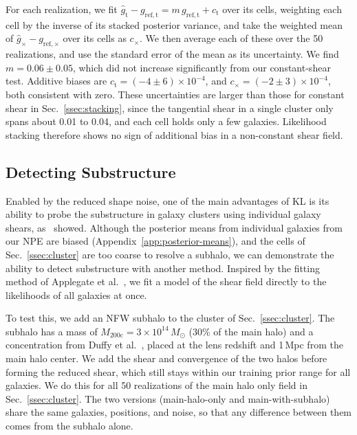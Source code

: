 For each realization, we fit $\hat{g}_\mathrm{t} - g_{\mathrm{ref,t}} = m\, g_{\mathrm{ref,t}} + c_\mathrm{t}$ over its cells, weighting each cell by the inverse of its stacked posterior variance, and take the weighted mean of $\hat{g}_\times - g_{\mathrm{ref},\times}$ over its cells as $c_\times$. We then average each of these over the 50 realizations, and use the standard error of the mean as its uncertainty. We find $m = 0.06 \pm 0.05$, which did not increase significantly from our constant-shear test. Additive biases are $c_\mathrm{t} = (-4 \pm 6) \times 10^{-4}$, and $c_\times = (-2 \pm 3) \times 10^{-4}$, both consistent with zero. These uncertainties are larger than those for constant shear in Sec.~\ref{ssec:stacking}, since the tangential shear in a single cluster only spans about 0.01 to 0.04, and each cell holds only a few galaxies.  Likelihood stacking therefore shows no sign of additional bias in a non-constant shear field. 

\subsection{Detecting Substructure}
\label{ssec:substructure}

Enabled by the reduced shape noise, one of the main advantages of KL is its ability to probe the substructure in galaxy clusters using individual galaxy shears, as~\citep{KLCluster} showed. Although the posterior means from individual galaxies from our NPE are biased (Appendix~\ref{app:posterior-means}), and the cells of Sec.~\ref{ssec:cluster} are too coarse to resolve a subhalo, we can demonstrate the ability to detect substructure with another method. Inspired by the fitting method of Applegate et al.~\citep{WtG3}, we fit a model of the shear field directly to the likelihoods of all galaxies at once.

To test this, we add an NFW subhalo to the cluster of Sec.~\ref{ssec:cluster}. The subhalo has a mass of $M_\mathrm{200c} = 3\times10^{14}\,M_\odot$ (30\% of the main halo) and a concentration from Duffy et al.~\citep{Duffy08}, placed at the lens redshift and 1\,Mpc from the main halo center. We add the shear and convergence of the two halos before forming the reduced shear, which still stays within our training prior range for all galaxies. We do this for all 50 realizations of the main halo only field in Sec.~\ref{ssec:cluster}. The two versions (main-halo-only and main-with-subhalo) share the same galaxies, positions, and noise, so that any difference between them comes from the subhalo alone.

